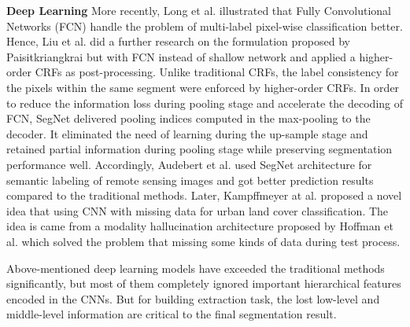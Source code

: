 \textbf{Deep Learning} More recently, Long et al. \cite{IEEEexample:Long_2015_CVPR} illustrated that Fully Convolutional Networks (FCN) handle the problem of multi-label pixel-wise classification better.
Hence, Liu et al. \cite{IEEEexample:liu2017dense} did a further research on the formulation proposed by Paisitkriangkrai \cite{IEEEexample:paisitkriangkrai2015effective} but with FCN instead of shallow network and applied a higher-order CRFs as post-processing.
Unlike traditional CRFs, the label consistency for the pixels within the same segment were enforced by higher-order CRFs.
In order to reduce the information loss during pooling stage and accelerate the decoding of FCN, SegNet \cite{IEEEexample:badrinarayanan2017segnet} delivered pooling indices computed in the max-pooling to the decoder.
It eliminated the need of learning during the up-sample stage and retained partial information during pooling stage while preserving segmentation performance well.
Accordingly, Audebert et al. \cite{IEEEexample:audebert2017deep} used SegNet architecture for semantic labeling of remote sensing images and got better prediction results compared to the traditional methods.
Later, Kampffmeyer at al. \cite{IEEEexample:kampffmeyer2017urban} proposed a novel idea that using CNN with missing data for urban land cover classification.
The idea is came from a modality hallucination architecture proposed by Hoffman et al. \cite{IEEEexample:hoffman2016learning} which solved the problem that missing some kinds of data during test process.


Above-mentioned deep learning models have exceeded the traditional methods significantly, but most of them completely ignored important hierarchical features encoded in the CNNs.
But for building extraction task, the lost low-level and middle-level information are critical to the final segmentation result.



